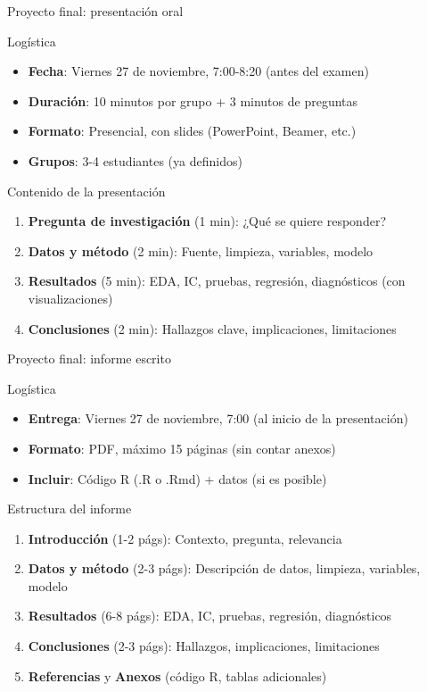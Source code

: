 \documentclass[aspectratio=169, 11pt]{beamer}
\begin{document}
\begin{frame}{Proyecto final: presentación oral}
\begin{block}{Logística}
\small
\begin{itemize}
\item \textbf{Fecha}: Viernes 27 de noviembre, 7:00-8:20 (antes del examen)
\item \textbf{Duración}: 10 minutos por grupo + 3 minutos de preguntas
\item \textbf{Formato}: Presencial, con slides (PowerPoint, Beamer, etc.)
\item \textbf{Grupos}: 3-4 estudiantes (ya definidos)
\end{itemize}
\end{block}

\begin{block}{Contenido de la presentación}
\small
\begin{enumerate}
\item \textbf{Pregunta de investigación} (1 min): ¿Qué se quiere responder?
\item \textbf{Datos y método} (2 min): Fuente, limpieza, variables, modelo
\item \textbf{Resultados} (5 min): EDA, IC, pruebas, regresión, diagnósticos (con visualizaciones)
\item \textbf{Conclusiones} (2 min): Hallazgos clave, implicaciones, limitaciones
\end{enumerate}
\end{block}
\end{frame}

\begin{frame}{Proyecto final: informe escrito}
\begin{block}{Logística}
\small
\begin{itemize}
\item \textbf{Entrega}: Viernes 27 de noviembre, 7:00 (al inicio de la presentación)
\item \textbf{Formato}: PDF, máximo 15 páginas (sin contar anexos)
\item \textbf{Incluir}: Código R (.R o .Rmd) + datos (si es posible)
\end{itemize}
\end{block}

\begin{block}{Estructura del informe}
\small
\begin{enumerate}
\item \textbf{Introducción} (1-2 págs): Contexto, pregunta, relevancia
\item \textbf{Datos y método} (2-3 págs): Descripción de datos, limpieza, variables, modelo
\item \textbf{Resultados} (6-8 págs): EDA, IC, pruebas, regresión, diagnósticos
\item \textbf{Conclusiones} (2-3 págs): Hallazgos, implicaciones, limitaciones
\item \textbf{Referencias} y \textbf{Anexos} (código R, tablas adicionales)
\end{enumerate}
\end{block}
\end{frame}
\end{document}
